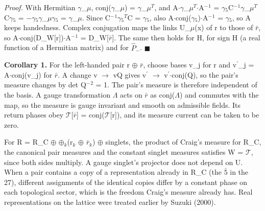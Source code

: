 \documentclass[
  11pt,
]{article}
\begin{document}
\emph{Proof.} With Hermitian \ensuremath{\gamma}\_\ensuremath{\mu}, conj(\ensuremath{\gamma}\_\ensuremath{\mu}) = \ensuremath{\gamma}\_\ensuremath{\mu}\ensuremath{^{T}}, and A\ensuremath{\cdot}\ensuremath{\gamma}\_\ensuremath{\mu}\ensuremath{^{T}}\ensuremath{\cdot}A\ensuremath{^{-}}\ensuremath{^{1}} = \ensuremath{\gamma}\ensuremath{_{5}}C\ensuremath{^{-}}\ensuremath{^{1}}\ensuremath{\gamma}\_\ensuremath{\mu}\ensuremath{^{T}}C\ensuremath{\gamma}\ensuremath{_{5}} = \ensuremath{-}\ensuremath{\gamma}\ensuremath{_{5}}\ensuremath{\gamma}\_\ensuremath{\mu}\ensuremath{\gamma}\ensuremath{_{5}} = \ensuremath{\gamma}\_\ensuremath{\mu}. Since C\ensuremath{^{-}}\ensuremath{^{1}}\ensuremath{\gamma}\ensuremath{_{5}}\ensuremath{^{T}}C = \ensuremath{\gamma}\ensuremath{_{5}}, also A\ensuremath{\cdot}conj(\ensuremath{\gamma}\ensuremath{_{5}})\ensuremath{\cdot}A\ensuremath{^{-}}\ensuremath{^{1}} = \ensuremath{\gamma}\ensuremath{_{5}}, so A keeps handedness. Complex conjugation maps the links U\_\ensuremath{\mu}(x) of r to those of \ensuremath{\bar{r}}, so A\ensuremath{\cdot}conj(D\_W{[}r{]})\ensuremath{\cdot}A\ensuremath{^{-}}\ensuremath{^{1}} = D\_W{[}\ensuremath{\bar{r}}{]}. The same then holds for H, for sign H (a real function of a Hermitian matrix) and for \ensuremath{\hat{P}}\ensuremath{_{-}}. \ensuremath{\blacksquare}

\textbf{Corollary 1.} For the left-handed pair r \ensuremath{\oplus} \ensuremath{\bar{r}}, choose bases v\_j for r and v\ensuremath{^{\prime}}\_j = A\ensuremath{\cdot}conj(v\_j) for \ensuremath{\bar{r}}. A change v \ensuremath{\to} vQ gives v\ensuremath{^{\prime}} \ensuremath{\to} v\ensuremath{^{\prime}}\ensuremath{\cdot}conj(Q), so the pair's measure changes by \textbar det Q\textbar\ensuremath{^{-}}\ensuremath{^{2}} = 1. The pair's measure is therefore independent of the basis. A gauge transformation \ensuremath{\Lambda} acts on \ensuremath{\bar{r}} as conj(\ensuremath{\Lambda}) and commutes with the map, so the measure is gauge invariant and smooth on admissible fields. Its return phases obey \ensuremath{\mathcal{T}}{[}\ensuremath{\bar{r}}{]} = conj(\ensuremath{\mathcal{T}}{[}r{]}), and its measure current can be taken to be zero.

For R = R\_C \ensuremath{\oplus} \ensuremath{\oplus}\ensuremath{_{k}}(r\ensuremath{_{k}} \ensuremath{\oplus} \ensuremath{\bar{r}}\ensuremath{_{k}}) \ensuremath{\oplus} singlets, the product of Craig's measure for R\_C, the canonical pair measures and the constant singlet measures satisfies W = \ensuremath{\mathcal{T}}, since both sides multiply. A gauge singlet's projector does not depend on U. When a pair contains a copy of a representation already in R\_C (the \ensuremath{\bar{5}} in the 27), different assignments of the identical copies differ by a constant phase on each topological sector, which is the freedom Craig's measure already has. Real representations on the lattice were treated earlier by Suzuki (2000).
\end{document}
